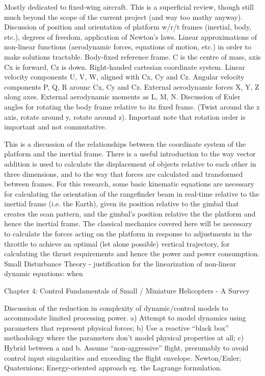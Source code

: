 \documentclass[10pt]{article}
\begin{document}
Mostly dedicated to fixed-wing aircraft.
This is a superficial review, though still much beyond the scope of the current project (and way too mathy anyway).
Discussion of position and orientation of platform w/r/t frames (inertial, body, etc.), degrees of freedom, application of Newton’s laws.
Linear approximations of non-linear functions (aerodynamic forces, equations of motion, etc.) in order to make solutions tractable.
Body-fixed reference frame. C is the centre of mass, axis Cx is forward, Cz is down. Right-handed cartesian coordinate system.
Linear velocity components U, V, W, aligned with Cx, Cy and Cz.
Angular velocity components P, Q, R arounc Cx, Cy and Cz.
External aerodynamic forces X, Y, Z along axes. External aerodynamic moments as L, M, N.
Discussion of Euler angles for rotating the body frame relative to its fixed frame. (Twist around the z axis, rotate around y, rotate around z).
Important note that rotation order is important and not commutative.


This is a discussion of the relationships between the coordinate system of the platform and the inertial frame. There is a useful introduction to the way vector addition is used to calculate the displacement of objects relative to each other in three dimensions, and to the way that forces are calculated and transformed between frames. 
For this research, some basic kinematic equations are necessary for calculating the orientation of the rangefinder beam in real-time relative to the inertial frame (i.e. the Earth), given its position relative to the gimbal that creates the scan pattern, and the gimbal’s position relative the the platform and hence the inertial frame. 
The classical mechanics covered here will be necessary to calculate the forces acting on the platform in response to adjustments in the throttle to achieve an optimal (let alone possible) vertical trajectory, for calculating the thrust requirements and hence the power and power consumption.
Small Disturbance Theory - justification for the linearization of non-linear dynamic equations: when 

Chapter 4: Control Fundamentals of Small / Miniature Helicopters - A Survey

Discussion of the reduction in complexity of dynamic/control models to accommodate limited processing power. 
a) Attempt to model dynamics using parameters that represent physical forces; b) Use a reactive “black box” methodology where the parameters don’t model physical properties at all; c) Hybrid between a and b.
Assume “non-aggressive” flight, presumably to avoid control input singularities and exceeding the flight envelope.
Newton/Euler; Quaternions; Energy-oriented approach eg. the Lagrange formulation.
\end{document}
